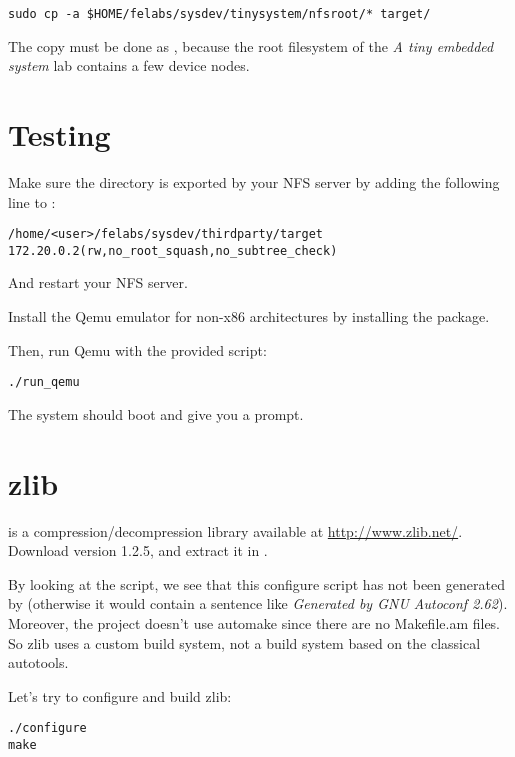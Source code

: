 \begin{verbatim}
sudo cp -a $HOME/felabs/sysdev/tinysystem/nfsroot/* target/
\end{verbatim}

The copy must be done as , because the root filesystem of
the {\em A tiny embedded system} lab contains a few device nodes.

\section{Testing}

Make sure the  directory is exported by your NFS server
by adding the following line to :

\scriptsize
\begin{verbatim}
/home/<user>/felabs/sysdev/thirdparty/target 172.20.0.2(rw,no_root_squash,no_subtree_check)
\end{verbatim}
\normalsize

And restart your NFS server.

Install the Qemu emulator for non-x86 architectures by installing the
 package.

Then, run Qemu with the provided script:

\begin{verbatim}
./run_qemu
\end{verbatim}

The system should boot and give you a prompt.

\section{zlib}

 is a compression/decompression library available at
\url{http://www.zlib.net/}. Download version 1.2.5, and extract it in
.

By looking at the  script, we see that this configure
script has not been generated by  (otherwise it would
contain a sentence like {\em Generated by GNU Autoconf
  2.62}). Moreover, the project doesn't use automake since there are
no Makefile.am files. So zlib uses a custom build system, not a build
system based on the classical autotools.

Let's try to configure and build zlib:

\begin{verbatim}
./configure
make
\end{verbatim}

